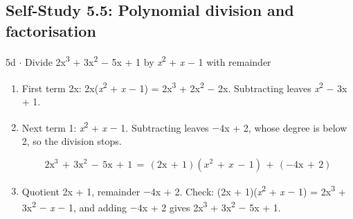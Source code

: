 \documentclass[11pt]{article}
\begin{document}
\begin{keepsection}\subsection{Self-Study 5.5: Polynomial division and factorisation}

\begin{workedbox}{5d \ensuremath{\cdot} Divide 2x\textsuperscript{3} + 3x\textsuperscript{2} \ensuremath{-} 5x + 1 by \textit{x}\textsuperscript{2} + \textit{x} \ensuremath{-} 1 with remainder}
\begin{enumerate}
\item First term 2x: 2x(\textit{x}\textsuperscript{2} + \textit{x} \ensuremath{-} 1) = 2x\textsuperscript{3} + 2x\textsuperscript{2} \ensuremath{-} 2x. Subtracting leaves \textit{x}\textsuperscript{2} \ensuremath{-} 3x + 1.
\item {}
Next term 1: \textit{x}\textsuperscript{2} + \textit{x} \ensuremath{-} 1. Subtracting leaves \ensuremath{-}4x + 2, whose degree is below 2, so the division stops.

\begin{equation*}2\mathrm{x}^{3}\, +\, 3\mathrm{x}^{2}\, -\, 5\mathrm{x}\, +\, 1\, =\, (2\mathrm{x}\, +\, 1)({x}^{2}\, +\, {x}\, -\, 1)\, +\, (-4\mathrm{x}\, +\, 2)\end{equation*}
\item Quotient 2x + 1, remainder \ensuremath{-}4x + 2. Check: (2x + 1)(\textit{x}\textsuperscript{2} + \textit{x} \ensuremath{-} 1) = 2x\textsuperscript{3} + 3x\textsuperscript{2} \ensuremath{-} \textit{x} \ensuremath{-} 1, and adding \ensuremath{-}4x + 2 gives 2x\textsuperscript{3} + 3x\textsuperscript{2} \ensuremath{-} 5x + 1.
\end{enumerate}
\end{workedbox}

\end{keepsection}
\end{document}
